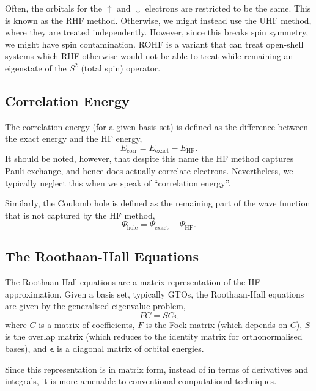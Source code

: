 Often, the orbitals for the $\uparrow$ and $\downarrow$ electrons are restricted to be the same. This is known as the \gls{RHF} method. Otherwise, we might instead use the \gls{UHF} method, where they are treated independently. However, since this breaks spin symmetry, we might have spin contamination. \gls{ROHF} is a variant that can treat open-shell systems which \gls{RHF} otherwise would not be able to treat while remaining an eigenstate of the $S^2$ (total spin) operator.

\subsection{Correlation Energy}

The correlation energy (for a given basis set) is defined as the difference between the exact energy and the \gls{HF} energy,
\begin{equation}
E_\mathrm{corr} = E_\mathrm{exact} - E_\mathrm{HF}.
\end{equation}
It should be noted, however, that despite this name the \gls{HF} method captures Pauli exchange, and hence does actually correlate electrons. Nevertheless, we typically neglect this when we speak of ``correlation energy''.

Similarly, the Coulomb hole is defined as the remaining part of the wave function that is not captured by the \gls{HF} method,
\begin{equation}
    \Psi_\mathrm{hole} = \Psi_\mathrm{exact} - \Psi_\mathrm{HF}.
\end{equation}

\subsection{The Roothaan-Hall Equations}

The Roothaan-Hall equations are a matrix representation of the \gls{HF} approximation.\cite{roothaanNew1951,hallMolecular1997} Given a basis set, typically \glspl{GTO}, the Roothaan-Hall equations are given by the generalised eigenvalue problem,
\begin{equation}
    FC = SC\bm\epsilon
\end{equation}
where $C$ is a matrix of coefficients, $F$ is the Fock matrix (which depends on $C$), $S$ is the overlap matrix (which reduces to the identity matrix for orthonormalised bases), and $\bm\epsilon$ is a diagonal matrix of orbital energies.

Since this representation is in matrix form, instead of in terms of derivatives and integrals, it is more amenable to conventional computational techniques.


